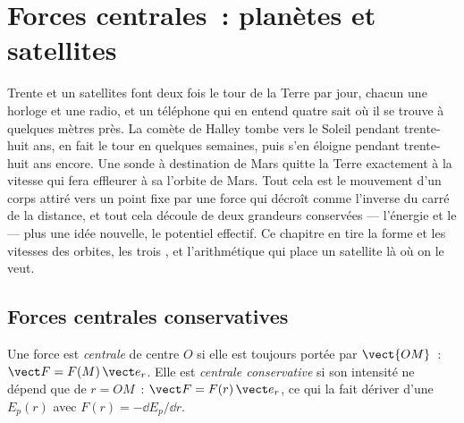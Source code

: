 \chapter{Forces centrales~: planètes et satellites}\label{ch:b1:central-forces}

Trente et un satellites font deux fois le tour de la Terre par jour,
chacun une horloge et une radio, et un téléphone qui en entend quatre
sait où il se trouve à quelques mètres près. La comète de Halley tombe
vers le Soleil pendant trente-huit ans, en fait le tour en quelques
semaines, puis s'en éloigne pendant trente-huit ans encore. Une sonde à
destination de Mars quitte la Terre exactement à la vitesse qui fera
effleurer à sa  l'orbite de Mars. Tout cela est le mouvement
d'un corps attiré vers un point fixe par une force qui décroît comme
l'inverse du carré de la distance, et tout cela découle de deux
grandeurs conservées --- l'énergie et le  --- plus une
idée nouvelle, le potentiel effectif. Ce chapitre en tire la forme et
les vitesses des orbites, les trois , et l'arithmétique
qui place un satellite là où on le veut.

\section{Forces centrales conservatives}

\begin{definition}\label{def:b1:central-forces:central}
Une force est \emph{centrale} de centre $O$ si elle est toujours portée
par $\vect{OM}$~: $\vect F = F(M)\,\vect e_r$. Elle est \emph{centrale
conservative} si son intensité ne dépend que de $r = OM$~: $\vect F =
F(r)\,\vect e_r$, ce qui la fait dériver d'une 
$E_p(r)$ avec $F(r) = -\dd E_p/\dd r$.
\end{definition}

